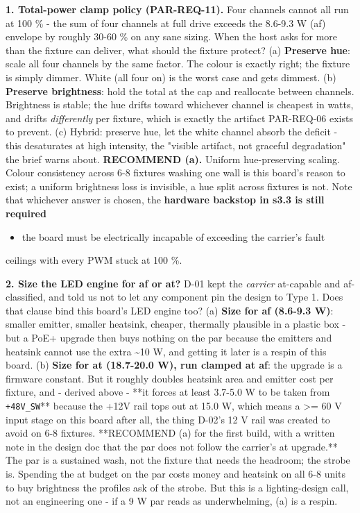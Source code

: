 \documentclass[11pt,a4paper]{article}
\begin{document}
\textbf{1. Total-power clamp policy (PAR-REQ-11).} Four channels cannot all run at 100 \% - the sum of four channels at full drive exceeds the 8.6-9.3 W (af) envelope by roughly 30-60 \% on any sane sizing. When the host asks for more than the fixture can deliver, what should the fixture protect? (a) \textbf{Preserve hue}: scale all four channels by the same factor. The colour is exactly right; the fixture is simply dimmer. White (all four on) is the worst case and gets dimmest. (b) \textbf{Preserve brightness}: hold the total at the cap and reallocate between channels. Brightness is stable; the hue drifts toward whichever channel is cheapest in watts, and drifts \emph{differently} per fixture, which is exactly the artifact PAR-REQ-06 exists to prevent. (c) Hybrid: preserve hue, let the white channel absorb the deficit - this desaturates at high intensity, the "visible artifact, not graceful degradation" the brief warns about. \textbf{RECOMMEND (a).} Uniform hue-preserving scaling. Colour consistency across 6-8 fixtures washing one wall is this board's reason to exist; a uniform brightness loss is invisible, a hue split across fixtures is not. Note that whichever answer is chosen, the \textbf{hardware backstop in s3.3 is still required}

\begin{itemize}
\item the board must be electrically incapable of exceeding the carrier's fault
\end{itemize}
ceilings with every PWM stuck at 100 \%.

\textbf{2. Size the LED engine for af or at?} D-01 kept the \emph{carrier} at-capable and af-classified, and told us not to let any component pin the design to Type 1. Does that clause bind this board's LED engine too? (a) \textbf{Size for af (8.6-9.3 W)}: smaller emitter, smaller heatsink, cheaper, thermally plausible in a plastic box - but a PoE+ upgrade then buys nothing on the par because the emitters and heatsink cannot use the extra \textasciitilde{}10 W, and getting it later is a respin of this board. (b) \textbf{Size for at (18.7-20.0 W), run clamped at af}: the upgrade is a firmware constant. But it roughly doubles heatsink area and emitter cost per fixture, and - derived above - {*}{*}it forces at least 3.7-5.0 W to be taken from \texttt{+48V\_SW}{*}{*} because the +12V rail tops out at 15.0 W, which means a \textgreater{}= 60 V input stage on this board after all, the thing D-02's 12 V rail was created to avoid on 6-8 fixtures. {*}{*}RECOMMEND (a) for the first build, with a written note in the design doc that the par does not follow the carrier's at upgrade.{*}{*} The par is a sustained wash, not the fixture that needs the headroom; the strobe is. Spending the at budget on the par costs money and heatsink on all 6-8 units to buy brightness the profiles ask of the strobe. But this is a lighting-design call, not an engineering one - if a 9 W par reads as underwhelming, (a) is a respin.
\end{document}
